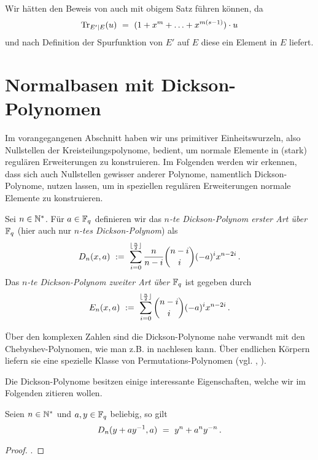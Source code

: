 \begin{bemerkung}
  Wir hätten den Beweis von  auch mit obigem
  Satz führen können, da 
  \[ \operatorname{Tr}_{E'\mid E}(u) \ =\  (1+x^m+\ldots + x^{m(s-1)})\cdot u \]
  und nach Definition der Spurfunktion von 
  $E'$ auf $E$ diese ein Element in $E$ liefert. 
\end{bemerkung}



\section{Normalbasen mit Dickson-Polynomen}

Im vorangegangenen Abschnitt haben wir uns primitiver Einheitswurzeln,
also Nullstellen der Kreisteilungspolynome, bedient,
um normale Elemente in (stark) regulären Erweiterungen zu konstruieren. Im
Folgenden werden wir erkennen, dass sich auch Nullstellen gewisser anderer
Polynome, namentlich Dickson-Polynome, nutzen lassen, um in speziellen
regulären Erweiterungen normale Elemente zu konstruieren.

\begin{definition}
  \label{def:dickson}
  Sei $n \in \mathbb{N}^\ast$. Für $a \in \mathbb{F}_q$ definieren wir das
  \emph{$n$-te Dickson-Polynom erster Art über $\mathbb{F}_q$} 
  (hier auch nur \emph{$n$-tes Dickson-Polynom}) als
  \[ D_n(x,a) \ :=\  \sum_{i=0}^{\lfloor\frac n 2\rfloor} \frac{n}{n-i}
    \binom{n-i}{i} (-a)^i x^{n-2i}\,.\]
  Das \emph{$n$-te Dickson-Polynom zweiter Art über $\mathbb{F}_q$} ist gegeben durch
  \[ E_n(x,a) \ :=\  \sum_{i=0}^{\lfloor\frac n 2\rfloor} 
    \binom{n-i}{i} (-a)^i x^{n-2i}\,.\]
\end{definition}

\begin{bemerkung}
  Über den komplexen Zahlen sind die Dickson-Polynome 
  nahe verwandt mit den
  Chebyshev-Polynomen, wie man z.B. in \autocite[Absatz nach Corollary
  7.15]{lidl1997finite} nachlesen kann.
  Über endlichen Körpern liefern sie eine spezielle Klasse von
  Permutations-Polynomen (vgl. \autocite[Theorem 7.16]{lidl1997finite}, 
  \autocite[Section 9.6]{mullen2013handbook}).
\end{bemerkung}

Die Dickson-Polynome besitzen einige interessante Eigenschaften, 
welche wir im Folgenden zitieren wollen.

\begin{proposition}
  \label{satz:dickson_1}
   Seien $n\in \mathbb{N}^\ast$ und $a,y\in \mathbb{F}_q$ beliebig, so gilt
  \[ D_n(y+ay^{-1}, a) \ =\  y^n +a^ny^{-n}\,.\]
\end{proposition}
\begin{proof}
  \autocite[Gleichung (7.8)]{lidl1997finite}.
\end{proof}

